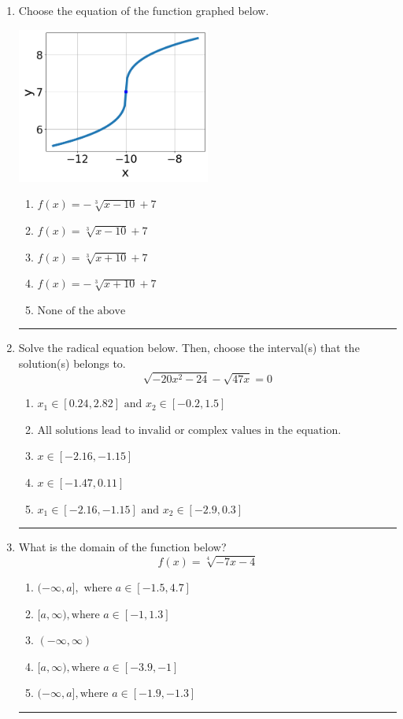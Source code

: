 \documentclass[14pt]{extbook}
\newcommand{\litem}[1]{\item#1\hspace*{-1cm}\rule{\textwidth}{0.4pt}}
\begin{document}
\begin{enumerate}
{\begin{enumerate}[label=\Alph*.]
\end{enumerate} }
\litem{
Choose the equation of the function graphed below.
\begin{center}
    \includegraphics[width=0.5\textwidth]{../Figures/radicalGraphToEquationC.png}
\end{center}
\begin{enumerate}[label=\Alph*.]
\item \( f(x) = - \sqrt[3]{x - 10} + 7 \)
\item \( f(x) = \sqrt[3]{x - 10} + 7 \)
\item \( f(x) = \sqrt[3]{x + 10} + 7 \)
\item \( f(x) = - \sqrt[3]{x + 10} + 7 \)
\item \( \text{None of the above} \)

\end{enumerate} }
\litem{
Solve the radical equation below. Then, choose the interval(s) that the solution(s) belongs to.\[ \sqrt{-20 x^2 - 24} - \sqrt{47 x} = 0 \]\begin{enumerate}[label=\Alph*.]
\item \( x_1 \in [0.24, 2.82] \text{ and } x_2 \in [-0.2,1.5] \)
\item \( \text{All solutions lead to invalid or complex values in the equation.} \)
\item \( x \in [-2.16,-1.15] \)
\item \( x \in [-1.47,0.11] \)
\item \( x_1 \in [-2.16, -1.15] \text{ and } x_2 \in [-2.9,0.3] \)

\end{enumerate} }
\litem{
What is the domain of the function below?\[ f(x) = \sqrt[4]{-7 x - 4} \]\begin{enumerate}[label=\Alph*.]
\item \( (-\infty, a], \text{ where } a \in [-1.5, 4.7] \)
\item \( [a, \infty), \text{where } a \in [-1, 1.3] \)
\item \( (-\infty, \infty) \)
\item \( [a, \infty), \text{where } a \in [-3.9, -1] \)
\item \( (-\infty, a], \text{where } a \in [-1.9, -1.3] \)


\end{enumerate}}
\end{enumerate}
\end{document}
